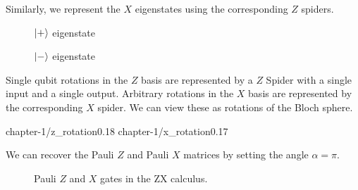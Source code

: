Similarly, we represent the $X$ eigenstates using the corresponding $Z$ spiders.

\begin{figure}[H]
\centering
\begin{minipage}{.4\textwidth}
    \centering
    \caption{$\ket +$ eigenstate}
\end{minipage}%
\begin{minipage}{.4\textwidth}
    \centering
    \caption{$\ket -$ eigenstate}
\end{minipage}
\end{figure}

Single qubit rotations in the $Z$ basis are represented by a $Z$ Spider with a single input and a single output. Arbitrary rotations in the $X$ basis are represented by the corresponding $X$ spider. We can view these as rotations of the Bloch sphere.

{chapter-1/z_rotation}{0.18}
\vspace*{-15pt}
{chapter-1/x_rotation}{0.17}

We can recover the Pauli $Z$ and Pauli $X$ matrices by setting the angle $\alpha = \pi$.

\begin{figure}[H]
\centering
{}
\caption{Pauli $Z$ and $X$ gates in the ZX calculus.}
\end{figure}

